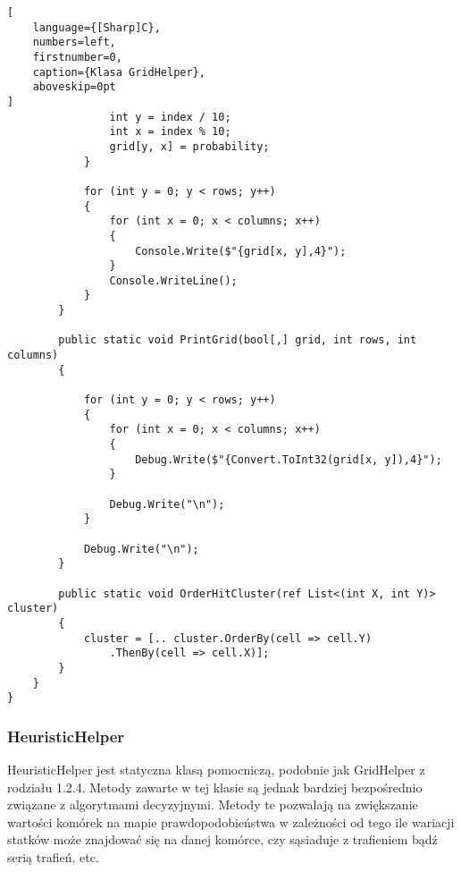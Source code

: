 \begin{addmargin}[0mm]{0mm}
\begin{lstlisting}[
    language={[Sharp]C},
    numbers=left,
    firstnumber=0,
    caption={Klasa GridHelper},
    aboveskip=0pt
]
                int y = index / 10;
                int x = index % 10;
                grid[y, x] = probability;
            }

            for (int y = 0; y < rows; y++)
            {
                for (int x = 0; x < columns; x++)
                {
                    Console.Write($"{grid[x, y],4}");
                }
                Console.WriteLine();
            }
        }

        public static void PrintGrid(bool[,] grid, int rows, int columns)
        {

            for (int y = 0; y < rows; y++)
            {
                for (int x = 0; x < columns; x++)
                {
                    Debug.Write($"{Convert.ToInt32(grid[x, y]),4}");
                }

                Debug.Write("\n");
            }

            Debug.Write("\n");
        }

        public static void OrderHitCluster(ref List<(int X, int Y)> cluster)
        {
            cluster = [.. cluster.OrderBy(cell => cell.Y)
                .ThenBy(cell => cell.X)];
        }
    }
}

\end{lstlisting}
\end{addmargin}





\tocless\subsubsection{HeuristicHelper}

HeuristicHelper jest statyczna klasą pomocniczą, podobnie jak GridHelper z rodziału 1.2.4. Metody zawarte w tej klasie są jednak bardziej bezpośrednio związane z algorytmami decyzyjnymi. Metody te pozwalają na zwiększanie wartości komórek na mapie prawdopodobieństwa w zależności od tego ile wariacji statków może znajdować się na danej komórce, czy sąsiaduje z trafieniem bądź serią trafień, etc.


